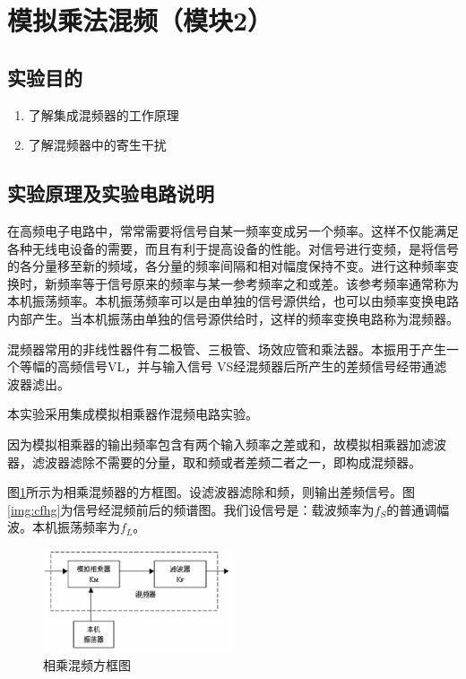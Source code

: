 \documentclass[12pt]{article}%
\numberwithin{equation}{section}
\begin{document}
\section{模拟乘法混频（模块2）}
\setcounter{equation}{0}
\setcounter{table}{0}
\setcounter{figure}{0}
\subsection{实验目的}
\begin{enumerate}\addtolength{\itemsep}{-1.5ex}
\item 了解集成混频器的工作原理
\item 了解混频器中的寄生干扰
\end{enumerate}
\subsection{实验原理及实验电路说明}\label{yl:hunpin}
在高频电子电路中，常常需要将信号自某一频率变成另一个频率。这样不仅能满足各种无线电设备的需要，而且有利于提高设备的性能。对信号进行变频，是将信号的各分量移至新的频域，各分量的频率间隔和相对幅度保持不变。进行这种频率变换时，新频率等于信号原来的频率与某一参考频率之和或差。该参考频率通常称为本机振荡频率。本机振荡频率可以是由单独的信号源供给，也可以由频率变换电路内部产生。当本机振荡由单独的信号源供给时，这样的频率变换电路称为混频器。\par
混频器常用的非线性器件有二极管、三极管、场效应管和乘法器。本振用于产生一个等幅的高频信号VL，并与输入信号 VS经混频器后所产生的差频信号经带通滤波器滤出。\par
本实验采用集成模拟相乘器作混频电路实验。\par
因为模拟相乘器的输出频率包含有两个输入频率之差或和，故模拟相乘器加滤波器，滤波器滤除不需要的分量，取和频或者差频二者之一，即构成混频器。\par
     图\ref{img:cfh}所示为相乘混频器的方框图。设滤波器滤除和频，则输出差频信号。图\ref{img:cfhg}为信号经混频前后的频谱图。我们设信号是：载波频率为$f_S$的普通调幅波。本机振荡频率为$f_L$。\par
       \begin{figure}[ht]
  \centering
  \includegraphics[width=0.5\textwidth]{image009.png} 
  \caption{ 相乘混频方框图} 
  \label{img:cfh} 
\end{figure}
\end{document}
